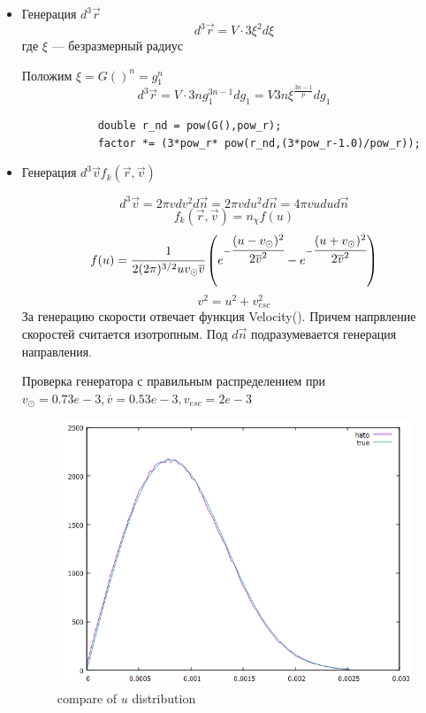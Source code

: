 	\begin{itemize}
		\item Генерация $d^3\vec{r}$
		\begin{equation*}
			d^3\vec{r} = V\cdot 3 \xi^2 d\xi
		\end{equation*}
		где $\xi$ --- безразмерный радиус
		
		Положим $\xi = G()^{n} = g_1^n$
		\begin{equation*}
			d^3\vec{r} = V\cdot 3n g_1^{3n-1} d g_1 = V3n\xi^{\frac{3n-1}{p}} d g_1
		\end{equation*}
		
		\begin{lstlisting}
			double r_nd = pow(G(),pow_r);
			factor *= (3*pow_r* pow(r_nd,(3*pow_r-1.0)/pow_r));
		\end{lstlisting}
		
		\item Генерация $d^{3}\vec{v}f_{k}\left( {\vec{r},\vec{v}} \right)$
		
		\begin{equation*}
			d^{3}\vec{v} = 2\pi v dv^2 d\vec{n} = 2\pi v du^2 d\vec{n} = 4\pi vu du d\vec{n}
		\end{equation*}
		\begin{equation*}
			f_{k}\left( {\vec{r},\vec{v}} \right) = n_{\chi}f(u) 
		\end{equation*}
		\begin{equation*}
			f(u) = \cfrac{1}{2 (2\pi)^{3/2}u v_{\odot} 	\overline{v}} \left(
			e^{-\cfrac{(u-v_{\odot})^2}{2	\overline{v}^2}} - 
			e^{-\cfrac{(u+v_{\odot})^2}{2	\overline{v}^2}}
			\right)
		\end{equation*}
		\begin{equation*}
			v^2 = u^2 + v_{esc}^2
		\end{equation*}
		За генерацию скорости отвечает функция Velocity(). Причем напрвление скоростей считается изотропным. Под $d\vec{n}$ подразумевается генерация направления.
		
		Проверка генератора с правильным распределением при $v_{\odot}=0.73e-3, \overline{v} = 0.53e-3,  v_{esc} = 2e-3$
		\begin{figure}[ht]
			\centering
			\includegraphics[scale=0.4]{velocity_generator.png}
			\caption{compare of $u$ distribution}
		\end{figure}
		

\end{itemize}
